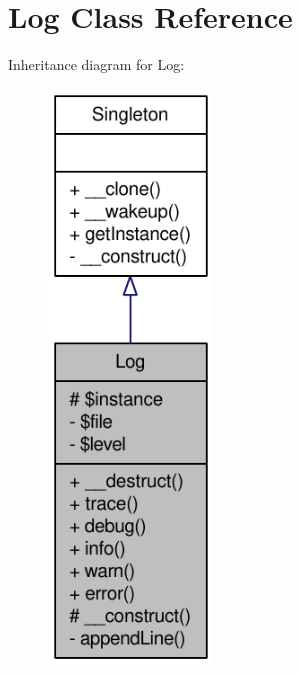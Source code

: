 \hypertarget{classLog}{
\section{Log Class Reference}
\label{classLog}
}


Inheritance diagram for Log:\nopagebreak
\begin{figure}[H]
\begin{center}
\leavevmode
\includegraphics[width=124pt]{classLog__inherit__graph}
\end{center}
\end{figure}


